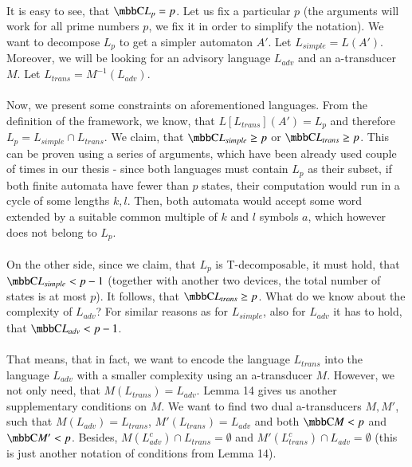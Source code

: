 \paragraph{}
It is easy to see, that $\C{L_p} = p$. Let us fix a particular $p$ (the arguments will work for all prime numbers $p$, we fix it in order to simplify the notation). We want to decompose $L_p$ to get a simpler automaton $A'$. Let $L_{simple} = L(A')$. Moreover, we will be looking for an advisory language $L_{adv}$ and an a-transducer $M$. Let $L_{trans} = M^{-1}(L_{adv})$.

\paragraph{}
Now, we present some constraints on aforementioned languages. From the definition of the framework, we know, that $L[L_{trans}](A') = L_p$ and therefore $L_p = L_{simple} \cap L_{trans}$. We claim, that $\C{L_{simple}} \geq p$ or $\C{L_{trans}} \geq p$. This can be proven using a series of arguments, which have been already used couple of times in our thesis - since both languages must contain $L_p$ as their subset, if both finite automata have fewer than $p$ states, their computation would run in a cycle of some lengths $k, l$. Then, both automata would accept some word extended by a suitable common multiple of $k$ and $l$ symbols $a$, which however does not belong to $L_p$.

\paragraph{}
On the other side, since we claim, that $L_p$ is T-decomposable, it must hold, that $\C{L_{simple}} \allowbreak < p-1$ (together with another two devices, the total number of states is at most $p$). It follows, that $\C{L_{trans}} \geq p$. What do we know about the complexity of $L_{adv}$? For similar reasons as for $L_{simple}$, also for $L_{adv}$ it has to hold, that $\C{L_{adv}} < p-1$.

\paragraph{}
That means, that in fact, we want to encode the language $L_{trans}$ into the language $L_{adv}$ with a smaller complexity using an a-transducer $M$. However, we not only need, that $M(L_{trans}) = L_{adv}$. Lemma 14 gives us another supplementary conditions on $M$. We want to find two dual a-transducers $M, M'$, such that $M(L_{adv}) = L_{trans}$, $M'(L_{trans}) = L_{adv}$ and both $\C{M} < p$ and $\C{M'} < p$. Besides, $M(L^c_{adv}) \cap L_{trans} = \emptyset$ and $M'(L^c_{trans}) \cap L_{adv} = \emptyset$ (this is just another notation of conditions from Lemma 14).

